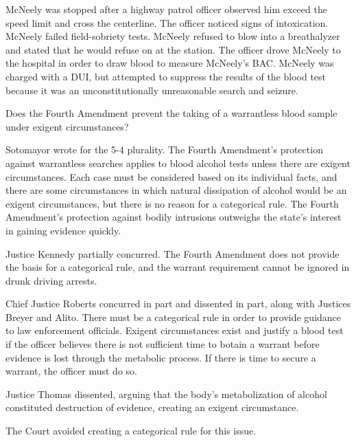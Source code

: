 \documentclass[paper=letter,fontsize=10pt]{article}
\begin{document}
	\begin{description}[align=right]
		\item[Facts] \noindent
			McNeely was stopped after a highway patrol officer observed him exceed the speed limit and cross the centerline. 
			The officer noticed signs of intoxication. McNeely failed field-sobriety tests.
			McNeely refused to blow into a breathalyzer and stated that he would refuse on at the station. 
			The officer drove McNeely to the hospital in order to draw blood to measure McNeely’s BAC.
			McNeely was charged with a DUI, but attempted to suppress the results of the blood test because it was an unconstitutionally unreasonable search and seizure.
		\item[Issue] \noindent
			Does the Fourth Amendment prevent the taking of a warrantless blood sample under exigent circumstances?
		\item[Holding] \noindent
			Sotomayor wrote for the 5-4 plurality. The Fourth Amendment’s protection against warrantless searches applies to blood alcohol tests unless there are exigent circumstances.
			Each case must be considered based on its individual facts, and there are some circumstances in which natural dissipation of alcohol would be an exigent circumstances, but there is no reason for a categorical rule.
			The Fourth Amendment’s protection against bodily intrusions outweighs the state’s interest in gaining evidence quickly.
		\item[Concurrence] \noindent
			Justice Kennedy partially concurred. The Fourth Amendment does not provide the basis for a categorical rule, and the warrant requirement cannot be ignored in drunk driving arrests. \par
			Chief Justice Roberts concurred in part and dissented in part, along with Justices Breyer and Alito. There must be a categorical rule in order to provide guidance to law enforcement officials.
			Exigent circumstances exist and justify a blood test if the officer believes there is not sufficient time to botain a warrant before evidence is lost through the metabolic process.
			If there is time to secure a warrant, the officer must do so.
		\item[Dissent] \noindent
			Justice Thomas dissented, arguing that the body’s metabolization of alcohol constituted destruction of evidence, creating an exigent circumstance.
		\item[Rules] \noindent
			The Court avoided creating a categorical rule for this issue.
	\end{description}
\end{document}
